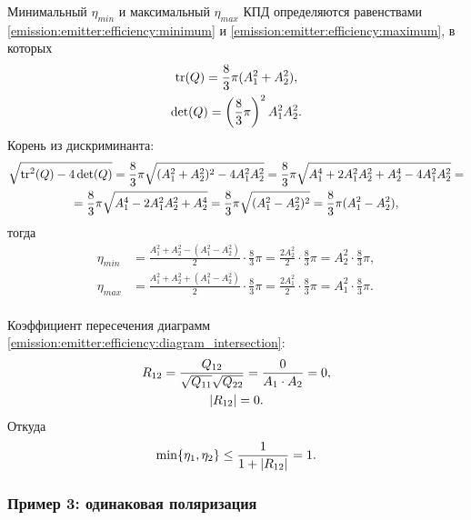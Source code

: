 Минимальный $\eta_{min}$ и максимальный $\eta_{max}$ КПД определяются равенствами \eqref{emission:emitter:efficiency:minimum} и \eqref{emission:emitter:efficiency:maximum}, в которых
\begin{gather*}
    \operatorname{tr}(Q) = \frac{8}{3} \pi ( A_1^2 + A_2^2 ) , \\
    \det(Q) = \left( \frac{8}{3} \pi \right)^2 A_1^2 A_2^2 .
\end{gather*}
Корень из дискриминанта:
\begin{multline*}
    \sqrt{\operatorname{tr}^2(Q) - 4 \det(Q)}
    = \frac{8}{3} \pi \sqrt{( A_1^2 + A_2^2 )^2 - 4 A_1^2 A_2^2}
    = \frac{8}{3} \pi \sqrt{A_1^4 + 2 A_1^2 A_2^2 + A_2^4 - 4 A_1^2 A_2^2} = \\
    = \frac{8}{3} \pi \sqrt{A_1^4 - 2 A_1^2 A_2^2 + A_2^4}
    = \frac{8}{3} \pi \sqrt{( A_1^2 - A_2^2 )^2}
    = \frac{8}{3} \pi ( A_1^2 - A_2^2 ),
\end{multline*}
тогда
\begin{align*}
    \eta_{min} &
    = \frac{A_1^2 + A_2^2 - ( A_1^2 - A_2^2 )}{2} \cdot \frac{8}{3} \pi
    = \frac{2 A_2^2}{2} \cdot \frac{8}{3} \pi
    = A_2^2 \cdot \frac{8}{3} \pi , \\
    \eta_{max} &
    = \frac{A_1^2 + A_2^2 + ( A_1^2 - A_2^2 )}{2} \cdot \frac{8}{3} \pi
    = \frac{2 A_1^2}{2} \cdot \frac{8}{3} \pi
    = A_1^2 \cdot \frac{8}{3} \pi . \\
\end{align*}

Коэффициент пересечения диаграмм \eqref{emission:emitter:efficiency:diagram_intersection}:
\begin{gather*}
    R_{12}
    = \frac{Q_{12}}{\sqrt{Q_{11}} \sqrt{Q_{22}}}
    = \frac{0}{A_1 \cdot A_2}
    = 0, \\
    \left | R_{12} \right | = 0 .
\end{gather*}
Откуда
\[
    \min \{ \eta_1, \eta_2 \} \le \frac{1}{1 + \left | R_{12} \right |} = 1.
\]

\subsubsection{Пример 3: одинаковая поляризация}


